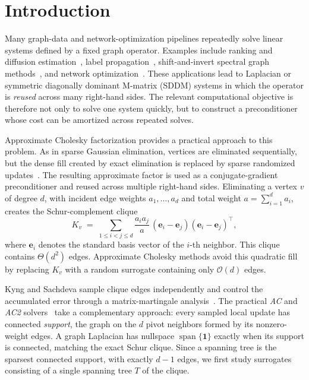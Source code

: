 \documentclass{article}
\newcommand{\AC}{\textit{AC}\xspace}
\newcommand{\ACtwo}{\textit{AC2}\xspace}
\newcommand{\calO}{\mathcal{O}}
\newcommand{\bigO}{\calO}
\newcommand{\1}{\mathbbm{1}}
\theoremstyle{plain}
\begin{document}
\maketitle


\section{Introduction}
Many graph-data and network-optimization pipelines repeatedly solve linear systems defined by a fixed graph operator. 
Examples include ranking and diffusion estimation~\cite{page1999pagerank,andersen2006local}, label propagation~\cite{zhu2003semi,zhou2003learning}, shift-and-invert spectral graph methods~\cite{huang2019isira}, and network optimization~\cite{spielman2004nearly,spielman2008graph}. 
These applications lead to Laplacian or symmetric diagonally dominant M-matrix (SDDM) systems in which the operator is \emph{reused} across many right-hand sides. The relevant computational objective is therefore not only to solve one system quickly, but to construct a pre\-conditioner whose cost can be amortized across repeated solves.


Approximate Cholesky factorization provides a practical approach to this problem. As in sparse Gaussian elimination, vertices are eliminated sequentially, but the dense fill created by exact
elimination is replaced by sparse randomized
updates~\cite{kyng2016approximate,AC}. The resulting approximate
factor is used as a conjugate-gradient pre\-conditioner and reused
across multiple right-hand sides. Eliminating a vertex $v$ of degree $d$,
with incident edge weights $a_1,\ldots,a_d$ and total weight
$a=\sum_{i=1}^{d} a_i$, creates the Schur-complement clique
\[
K_v \;=\; \sum_{1\leq i<j\leq d}
\frac{a_i a_j}{a}\,
(\mathbf e_i-\mathbf e_j)
(\mathbf e_i-\mathbf e_j)^\top,
\]
where $\mathbf e_i$ denotes the standard basis vector of the
$i$-th neighbor. This clique contains $\Theta(d^2)$ edges. Approximate Cholesky methods avoid this quadratic fill by replacing $K_v$ with a random surrogate containing only $\bigO(d)$ edges. 

Kyng and Sachdeva sample clique edges independently and control the accumulated error through a matrix-martingale analysis~\cite{kyng2016approximate}. The practical \AC{} and \ACtwo{} solvers~\cite{AC} take a complementary approach: every sampled local update has connected \emph{support}, the graph on the $d$ pivot neighbors formed by its nonzero-weight edges. A graph Laplacian has nullspace
$\operatorname{span}\{\mathbf 1\}$ exactly when its support is connected,
matching the exact Schur clique. Since a spanning tree is the sparsest connected support, with exactly $d-1$ edges, we first study surrogates consisting of a single spanning tree $T$ of the clique. 
\end{document}
